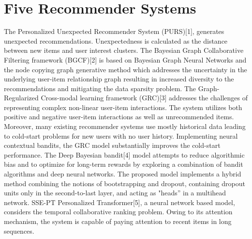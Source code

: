 \section{Five Recommender Systems}
The Personalized Unexpected Recommender System (PURS)[1], generates unexpected recommendations.  Unexpectedness is calculated as the distance between new items and user interest clusters. The Bayesian Graph Collaborative Filtering framework (BGCF)[2] is based on Bayesian Graph Neural Networks and the node copying graph generative method which addresses the uncertainty in the underlying user-item relationship graph resulting in increased diversity to the recommendations and mitigating the data sparsity problem. The Graph-Regularized Cross-modal learning framework (GRC)[3] addresses the challenges of representing complex non-linear user-item interactions. The system utilizes both positive and negative user-item interactions as well as unrecommended items. Moreover, many existing recommender systems use mostly historical data leading to cold-start problems for new users with no user history. Implementing neural contextual bandits, the GRC model substantially improves the cold-start performance. The Deep Bayesian bandit[4] model attempts to reduce algorithmic bias and to optimize for long-term rewards by exploring a combination of bandit algorithms and deep neural networks. The proposed model implements a hybrid method combining the notions of bootstrapping and dropout, containing dropout units only in the second-to-last layer, and acting as "heads” in a multihead network.
SSE-PT Personalized Transformer[5], a neural network based model,  considers the temporal collaborative ranking problem. Owing to its attention mechanism, the system is capable of paying attention to recent items in long sequences.
